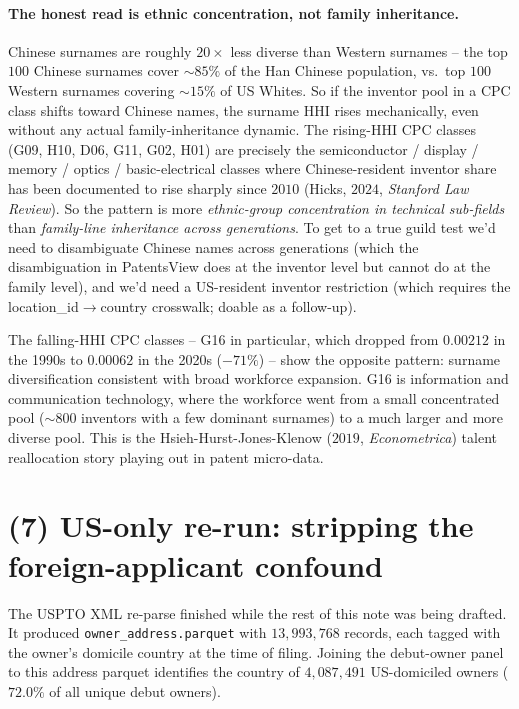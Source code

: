 \documentclass[11pt]{article}
\begin{document}
\paragraph{The honest read is ethnic concentration, not family
inheritance.} Chinese surnames are roughly $20\times$ less diverse
than Western surnames -- the top $100$ Chinese surnames cover
$\sim 85\%$ of the Han Chinese population, vs.\ top $100$ Western
surnames covering $\sim 15\%$ of US Whites. So if the inventor pool
in a CPC class shifts toward Chinese names, the surname HHI rises
mechanically, even without any actual family-inheritance dynamic.
The rising-HHI CPC classes (G09, H10, D06, G11, G02, H01) are
precisely the semiconductor / display / memory / optics /
basic-electrical classes where Chinese-resident inventor share has
been documented to rise sharply since $2010$ (Hicks, $2024$,
\emph{Stanford Law Review}). So the pattern is more
\emph{ethnic-group concentration in technical sub-fields} than
\emph{family-line inheritance across generations}. To get to a
true guild test we'd need to disambiguate Chinese names across
generations (which the disambiguation in PatentsView does at the
inventor level but cannot do at the family level), and we'd need a
US-resident inventor restriction (which requires the
location\_id$\to$country crosswalk; doable as a follow-up).

The falling-HHI CPC classes -- G16 in particular, which dropped from
$0.00212$ in the 1990s to $0.00062$ in the 2020s ($-71\%$) -- show
the opposite pattern: surname diversification consistent with broad
workforce expansion. G16 is information and communication technology,
where the workforce went from a small concentrated pool ($\sim 800$
inventors with a few dominant surnames) to a much larger and more
diverse pool. This is the Hsieh-Hurst-Jones-Klenow
($2019$, \emph{Econometrica}) talent reallocation story playing out
in patent micro-data.

\section*{(7) US-only re-run: stripping the foreign-applicant confound}

The USPTO XML re-parse finished while the rest of this note was
being drafted. It produced \texttt{owner\_address.parquet} with
$13{,}993{,}768$ records, each tagged with the owner's domicile
country at the time of filing. Joining the debut-owner panel to
this address parquet identifies the country of $4{,}087{,}491$
US-domiciled owners ($72.0\%$ of all unique debut owners).
\end{document}
